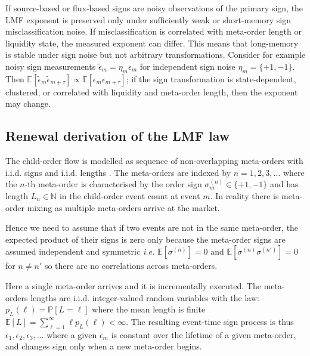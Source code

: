 \documentclass[5p,final]{elsarticle}
\newcommand{\Pp}{ \mathbb{P} }
\newcommand{\E}{\mathbb{E}}
\newcommand{\N}{\mathbb{N}}
\begin{document}
If source-based or flux-based signs are noisy observations of the primary sign, the LMF exponent is preserved only under sufficiently weak or short-memory sign misclassification noise. If misclassification is correlated with meta-order length or liquidity state, the measured exponent can differ. This means that long-memory is stable under sign noise but not arbitrary transformations. Consider for example noisy sign measurements $\tilde \epsilon_m = \eta_m \epsilon_m$ for independent sign noise $\eta_m = \{+1,-1\}$. Then $\E[\tilde \epsilon_m \tilde \epsilon_{m+\tau}] \propto \E[\epsilon_m \epsilon_{m+\tau}]$; if the sign transformation is state-dependent, clustered, or correlated with liquidity and meta-order length, then the exponent may change.

\subsection{Renewal derivation of the LMF law} \label{sec:lmf}


The child-order flow is modelled as sequence of non-overlapping meta-orders with i.i.d. signs and i.i.d. lengths \cite{sato2023prl,sato2024jsp}. The meta-orders are indexed by $n=1,2,3,\ldots$ where the $n$-th meta-order is characterised by the order sign $\sigma^{(n)}_m \in \{ +1 , -1 \}$ and has length $L_n \in \N$ in the child-order event count at event $m$. In reality there is meta-order mixing as multiple meta-orders arrive at the market. 

Hence we need to assume that if two events are not in the same meta-order, the expected product of their signs is zero only because the meta-order signs are assumed independent and symmetric {\it i.e.} $\E[\sigma^{(n)}]=0$ and $\E[\sigma^{(n)} \sigma^{(n')}] =0$ for $n \neq n'$ so there are no correlations across meta-orders.

Here a single meta-order arrives and it is incrementally executed. The meta-orders lengths are i.i.d. integer-valued random variables with the law: $p_L(\ell) = \Pp[L= \ell]$ where the mean length is finite $\E[L] = \sum_{\ell=1}^\infty \ell p_L(\ell) < \infty$. The resulting event-time sign process is thus $\epsilon_1,\epsilon_2,\epsilon_3,\ldots$ where a given $\epsilon_m$ is constant over the lifetime of a given meta-order, and changes sign only when a new meta-order begins.
\end{document}
